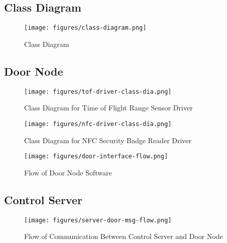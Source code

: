 \subsection{Class Diagram}

\begin{figure}[!htb]
\centering
\texttt{[image: figures/class-diagram.png]}
\caption{Class Diagram}
\label{fig:class-diagram}
\end{figure}

\subsection{Door Node}

\begin{figure}[!htb]
\centering
\texttt{[image: figures/tof-driver-class-dia.png]}
\caption{Class Diagram for Time of Flight Range Sensor Driver}
\end{figure}

\begin{figure}[!htb]
\centering
\texttt{[image: figures/nfc-driver-class-dia.png]}
\caption{Class Diagram for NFC Security Badge Reader Driver}
\end{figure}

\begin{figure}[!htb]
\centering
\texttt{[image: figures/door-interface-flow.png]}
\caption{Flow of Door Node Software}
\end{figure}

\subsection{Control Server}

\begin{figure}[!htb]
\centering
\texttt{[image: figures/server-door-msg-flow.png]}
\caption{Flow of Communication Between Control Server and Door Node}
\end{figure}



